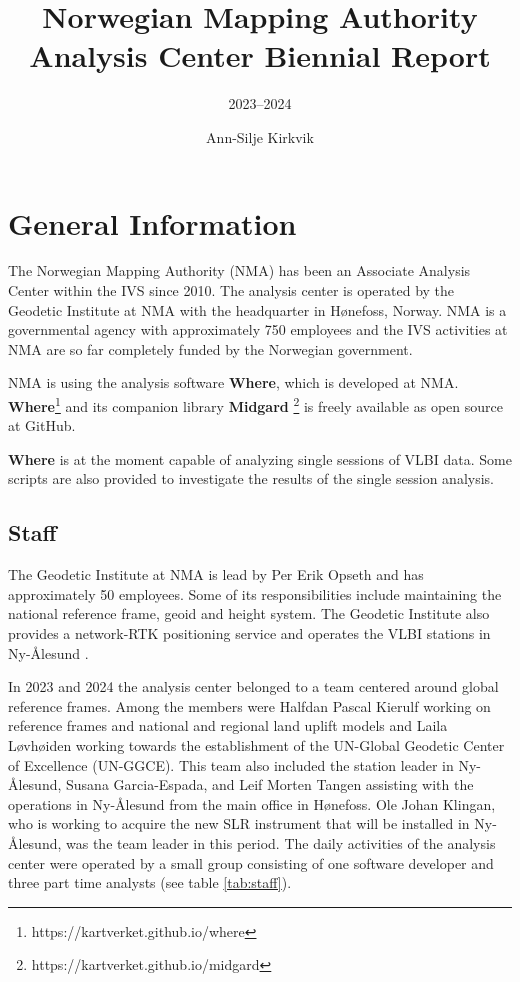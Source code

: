 \documentclass[twocolumn,twoside]{svmultivs_br} %
\title*{Norwegian Mapping Authority Analysis Center Biennial Report}
\subtitle{2023--2024}
\author{Ann-Silje Kirkvik}
\institute{Norwegian Mapping Authority (NMA)}
\begin{document}
%
\maketitle       %
%
%
\section{General Information}
%
The Norwegian Mapping Authority (NMA) has been an Associate Analysis Center
within the IVS since 2010. The analysis center is operated by the Geodetic
Institute at NMA with the headquarter in H\o nefoss, Norway. NMA is a governmental
agency with approximately 750 employees and the IVS activities at NMA are so far
completely funded by the Norwegian government.

NMA is using the analysis software \textbf{Where}, which is developed at NMA.
\textbf{Where}\footnote{https://kartverket.github.io/where} and its companion 
library \textbf{Midgard} \footnote{https://kartverket.github.io/midgard} is
freely available as open source at GitHub.

\textbf{Where} is at the moment capable of analyzing single sessions of VLBI data. 
Some scripts are also provided to investigate the results of the single session analysis.

\subsection{Staff}
The Geodetic Institute at NMA is lead by Per Erik Opseth and has approximately 50 employees. Some of its 
responsibilities include maintaining the
national reference frame, geoid and height system. The Geodetic Institute also provides a network-RTK positioning
service and operates the VLBI stations in Ny-\AA lesund \cite{ivsgm2022-nyal}.

In 2023 and 2024 the analysis center belonged to a team centered around global reference frames. Among the members
were Halfdan Pascal Kierulf working on reference frames and national and regional land uplift models and Laila L\o vh\o iden
working towards the establishment of the UN-Global Geodetic Center of Excellence (UN-GGCE). This team also
included the station leader in Ny-\AA lesund, Susana Garcia-Espada, and Leif Morten Tangen assisting with the operations in
Ny-\AA lesund from the main office in H\o nefoss. Ole Johan Klingan, who is working to acquire the new 
SLR instrument that will be installed in Ny-\AA lesund, was the team leader in this period. The daily activities of the analysis center were operated by a small group
consisting of one software developer and three part time analysts (see table \ref{tab:staff}).
\end{document}
